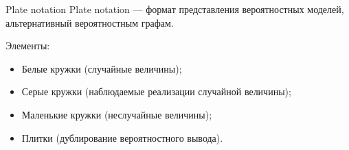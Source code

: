 \documentclass[usenames,dvipsnames,10pt,pdf,utf8,russian,aspectratio=43]{beamer}
\begin{document}
\begin{frame}{Plate notation}
Plate notation --- формат представления вероятностных моделей, альтернативный вероятностным графам.

Элементы:
\begin{itemize}
\item Белые кружки (случайные величины);
\item Серые кружки (наблюдаемые реализации случайной величины);
\item Маленькие кружки (неслучайные величины);
\item Плитки (дублирование вероятностного вывода).
\end{itemize}


\begin{figure}
  \centering
\label{fig:1}\qquad
\end{figure}
\end{frame}
\end{document}
